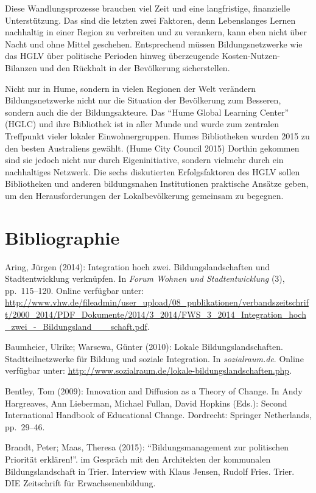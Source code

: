 \documentclass[a4paper,
fontsize=11pt,
oneside,
numbers=noperiodatend,
parskip=half-,
bibliography=totoc,
final
]{scrartcl}
\begin{document}
Diese Wandlungsprozesse brauchen viel Zeit und eine langfristige,
finanzielle Unterstützung. Das sind die letzten zwei Faktoren, denn
Lebenslanges Lernen nachhaltig in einer Region zu verbreiten und zu
verankern, kann eben nicht über Nacht und ohne Mittel geschehen.
Entsprechend müssen Bildungsnetzwerke wie das HGLV über politische
Perioden hinweg überzeugende Kosten-Nutzen-Bilanzen und den Rückhalt in
der Bevölkerung sicherstellen.

Nicht nur in Hume, sondern in vielen Regionen der Welt verändern
Bildungsnetzwerke nicht nur die Situation der Bevölkerung zum Besseren,
sondern auch die der Bildungsakteure. Das \enquote{Hume Global Learning
Center} (HGLC) und ihre Bibliothek ist in aller Munde und wurde zum
zentralen Treffpunkt vieler lokaler Einwohnergruppen. Humes Bibliotheken
wurden 2015 zu den besten Australiens gewählt. (Hume City Council 2015)
Dorthin gekommen sind sie jedoch nicht nur durch Eigeninitiative,
sondern vielmehr durch ein nachhaltiges Netzwerk. Die sechs diskutierten
Erfolgsfaktoren des HGLV sollen Bibliotheken und anderen bildungsnahen
Institutionen praktische Ansätze geben, um den Herausforderungen der
Lokalbevölkerung gemeinsam zu begegnen.

\hypertarget{bibliographie}{%
\section*{Bibliographie}\label{bibliographie}}

Aring, Jürgen (2014): Integration hoch zwei. Bildungslandschaften und
Stadtentwicklung verknüpfen. In \emph{Forum Wohnen und Stadtentwicklung}
(3), pp.~115--120. Online verfügbar unter:
\url{http://www.vhw.de/fileadmin/user_upload/08_publikationen/verbandszeitschrift/2000_2014/PDF_Dokumente/2014/3_2014/FWS_3_2014_Integration_hoch_zwei_-_Bildungsland___schaft.pdf}.

Baumheier, Ulrike; Warsewa, Günter (2010): Lokale Bildungslandschaften.
Stadtteilnetzwerke für Bildung und soziale Integration. In
\emph{sozialraum.de}. Online verfügbar unter:
\url{http://www.sozialraum.de/lokale-bildungslandschaften.php}.

Bentley, Tom (2009): Innovation and Diffusion as a Theory of Change. In
Andy Hargreaves, Ann Lieberman, Michael Fullan, David Hopkins (Eds.):
Second International Handbook of Educational Change. Dordrecht: Springer
Netherlands, pp.~29--46.

Brandt, Peter; Maas, Theresa (2015): \enquote{Bildungsmanagement zur
politischen Priorität erklären!}. im Gespräch mit den Architekten der
kommunalen Bildungslandschaft in Trier. Interview with Klaus Jensen,
Rudolf Fries. Trier. DIE Zeitschrift für Erwachsenenbildung.
\end{document}
